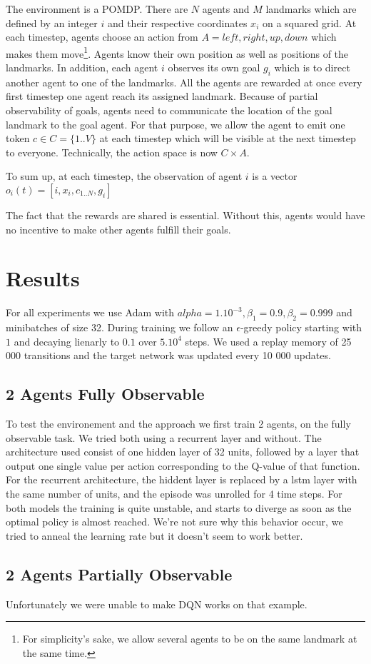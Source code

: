 \documentclass{article} %
\begin{document}
The environment is a POMDP. There are $N$ agents and $M$ landmarks which are defined by an integer $i$ and their respective coordinates $x_i$ on a squared grid. At each timestep, agents choose an action from $A={left, right, up, down}$ which makes them move\footnote{For simplicity's sake, we allow several agents to be on the same landmark at the same time.}. Agents know their own position as well as positions of the landmarks. In addition, each agent $i$ observes its own goal $g_i$ which is to direct another agent to one of the landmarks. All the agents are rewarded at once every first timestep one agent reach its assigned landmark. Because of partial observability of goals, agents need to communicate the location of the goal landmark to the goal agent. For that purpose, we allow the agent to emit one token $c \in C = \{1..V\}$ at each timestep which will be visible at the next timestep to everyone. Technically, the action space is now $C \times A$.

To sum up, at each timestep, the observation of agent $i$ is a vector $o_i(t) = [i, x_i, c_{1..N}, g_i]$

The fact that the rewards are shared is essential. Without this, agents would have no incentive to make other agents fulfill their goals.

\section{Results}
For all experiments we use Adam \cite{kingma2014adam} with $alpha=1.10^{-3}, \beta_1=0.9, \beta_2=0.999$ and minibatches of size 32. During training we follow an $\epsilon$-greedy policy starting with $1$ and decaying lienarly to $0.1$ over $5.10^4$ steps. We used a replay memory of 25 000 transitions and the target network was updated every 10 000 updates.
\subsection{2 Agents Fully Observable}
To test the environement and the approach we first train 2 agents, on the fully observable task.
We tried both using a recurrent layer and without. The architecture used  consist of one hidden layer of 32 units, followed by a layer that output one single value per action corresponding to the Q-value of that function. For the recurrent architecture, the hiddent layer is replaced by a lstm layer with the same number of units, and the episode was unrolled for 4 time steps.
For both models the training is quite unstable, and starts to diverge as soon as the optimal policy is almost reached. We're not sure why this behavior occur, we tried to anneal the learning rate but it doesn't seem to work better.


\subsection{2 Agents Partially Observable}
Unfortunately we were unable to make DQN works on that example.

  

\end{document}
